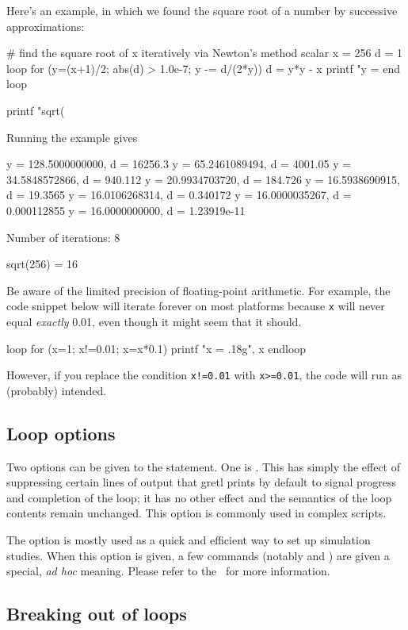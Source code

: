 Here's an example, in which we found the square root of a number by
successive approximations:
\begin{code}
# find the square root of x iteratively via Newton's method
scalar x = 256
d = 1
loop for (y=(x+1)/2; abs(d) > 1.0e-7; y -= d/(2*y))
    d = y*y - x
    printf "y = %
end loop

printf "sqrt(%
\end{code}
Running the example gives
\begin{code}
y =  128.5000000000, d = 16256.3
y =   65.2461089494, d = 4001.05
y =   34.5848572866, d = 940.112
y =   20.9934703720, d = 184.726
y =   16.5938690915, d = 19.3565
y =   16.0106268314, d = 0.340172
y =   16.0000035267, d = 0.000112855
y =   16.0000000000, d = 1.23919e-11

Number of iterations: 8

sqrt(256) = 16
\end{code}
Be aware of the limited precision of floating-point arithmetic. For
example, the code snippet below will iterate forever on most platforms
because \texttt{x} will never equal \textit{exactly} 0.01, even though
it might seem that it should.
\begin{code}
loop for (x=1; x!=0.01; x=x*0.1)
    printf "x = .18g\n", x
endloop  
\end{code}
However, if you replace the condition \texttt{x!=0.01} with
\texttt{x>=0.01}, the code will run as (probably) intended.
 
\subsection{Loop options}

Two options can be given to the  statement. One is
. This has simply the effect of suppressing certain
lines of output that gretl prints by default to signal progress and
completion of the loop; it has no other effect and the semantics of
the loop contents remain unchanged. This option is commonly used in
complex scripts.

The  option is mostly used as a quick and
efficient way to set up simulation studies. When this option is given,
a few commands (notably  and ) are given a
special, \emph{ad hoc} meaning. Please refer to the \GUG\ for more
information.
 
\subsection{Breaking out of loops}
\label{sec:loop-break}

